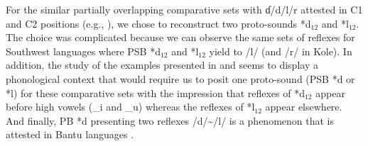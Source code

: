 \documentclass[output=paper,colorlinks,citecolor=brown
]{langscibook}
\begin{document}
For the similar partially overlapping comparative sets with ɗ/d/l/r attested in C1 and C2 positions (e.g., ), we chose to reconstruct two proto-sounds *d$_{12}$ and *l$_{12}$. The choice was complicated because we can observe the same sets of reflexes for Southwest languages where PSB *d$_{12}$ and *l$_{12}$ yield to /l/ (and /r/ in Kole). In addition, the study of the examples presented in  and  seems to display a phonological context that would require us to posit one proto-sound (PSB *d or *l) for these comparative sets with the impression that reflexes of *d$_{12}$ appear before high vowels (\_i and \_u) whereas the reflexes of *l$_{12}$ appear elsewhere. And finally, PB *d presenting two reflexes /d/\sim/l/ is a phenomenon that is attested in Bantu languages \citep{guthriecomparativebantu, meeussen1967, stewart1973, stewart1975, stewart1993, janssens1992, philippson2022}. 
\end{document}
